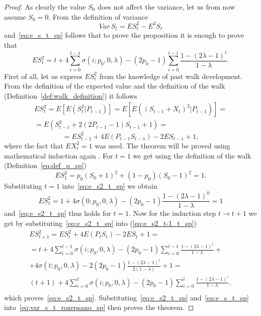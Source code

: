 \documentclass[runningheads]{CMSIM}
\begin{document}
    \begin{proof}
        As clearly the value $S_{0}$ does not affect the variance, let us
        from now assume $S_{0}=0$.
        From the definition of variance
        \begin{equation}
            Var\,S_{t}=ES_{t}^{2}-E^{2}S_{t}\label{eq:var_s_t_rozepsano_sp}
        \end{equation}
        and~\eqref{eq:e_s_t_sp} follows that to prove the proposition it
        is enough to prove that
        \begin{equation}
            ES_{t}^{2}=t+4\sum_{i=0}^{t-1}\sigma(i;p_{0},0,\lambda)-(2p_{0}-1)\sum_{i=0}^{t-1}\frac{1-(2\lambda-1)^{i}}{1-\lambda}.\label{eq:e_s2_t_sp}
        \end{equation}
        First of all, let us express $ES_{t}^{2}$ from the knowledge of past
        walk development.
        From the definition of the expected value and the
        definition of the walk (Definition~\ref{def:walk_definition}) it
        follows
        \begin{gather*}
            ES_{t}^{2}=E[E(S_{t}^{2}|P_{t-1})]=E[E((S_{t-1}+X_{t})^{2}|P_{t-1})]=\\
            =E(S_{t-1}^{2}+2(2P_{t-1}-1)S_{t-1}+1)=
        \end{gather*}
        \begin{equation}
            =ES_{t-1}^{2}+4E(P_{t-1}S_{t-1})-2ES_{t-1}+1,\label{eq:e_s2_t-1_t_sp}
        \end{equation}
        where the fact that $EX_{t}^{2}=1$ was used.
        The theorem will be
        proved using mathematical induction again .
        For $t=1$ we get using
        the definition of the walk (Definition~\ref{eq:def_p_sp})
        \[
            ES_{1}^{2}=p_{0}(S_{0}+1)^{2}+(1-p_{0})(S_{0}-1)^{2}=1.
        \]
        Substituting $t=1$ into~\eqref{eq:e_s2_t_sp} we obtain
        \[
            ES_{1}^{2}=1+4\sigma(0;p_{0},0,\lambda)-(2p_{0}-1)\frac{1-(2\lambda-1)^{0}}{1-\lambda}=1
        \]
        and~\eqref{eq:e_s2_t_sp} thus holds for $t=1$.
        Now for the induction
        step $t\rightarrow t+1$ we get by substituting~\eqref{eq:e_s2_t_sp}
        into (\ref{eq:e_s2_t-1_t_sp})
        \begin{gather*}
            ES_{t+1}^{2}=ES_{t}^{2}+4E(P_{t}S_{t})-2ES_{t}+1=\\
            =t+4\sum_{i=0}^{t-1}\sigma(i;p_{0},0,\lambda)-(2p_{0}-1)\sum_{i=0}^{t-1}\frac{1-(2\lambda-1)^{i}}{1-\lambda}+\\
            +4\sigma(t;p_{0},0,\lambda)-2(2p_{0}-1)\frac{1-(2\lambda-1)^{t}}{2(1-\lambda)}+1=\\
            (t+1)+4\sum_{i=0}^{t}\sigma(i;p_{0},0,\lambda)-(2p_{0}-1)\sum_{i=0}^{t}\frac{1-(2\lambda-1)^{i}}{1-\lambda},\\
        \end{gather*}
        which proves~\eqref{eq:e_s2_t_sp}.
        Substituting~\eqref{eq:e_s2_t_sp}
        and~\eqref{eq:e_s_t_sp} into~\eqref{eq:var_s_t_rozepsano_sp} then
        proves the theorem.
    \end{proof}
\end{document}
